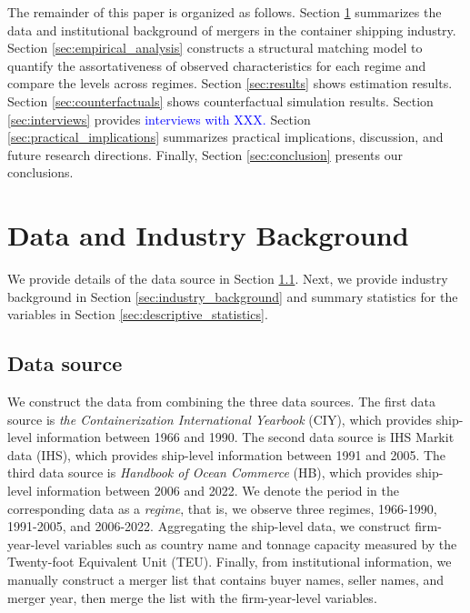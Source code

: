 \documentclass[10pt]{article}
\begin{document}
The remainder of this paper is organized as follows. 
Section \ref{sec:data_and_institutional_background} summarizes the data and institutional background of mergers in the container shipping industry.
Section \ref{sec:empirical_analysis} constructs a structural matching model to quantify the assortativeness of observed characteristics for each regime and compare the levels across regimes.
Section \ref{sec:results} shows estimation results.
Section \ref{sec:counterfactuals} shows counterfactual simulation results.
Section \ref{sec:interviews} provides \textcolor{blue}{interviews with XXX.}
Section \ref{sec:practical_implications} summarizes practical implications, discussion, and future research directions.
Finally, Section \ref{sec:conclusion} presents our conclusions.


\section{Data and Industry Background}\label{sec:data_and_institutional_background}
We provide details of the data source in Section \ref{sec:data_source}. Next, we provide industry background in
Section \ref{sec:industry_background} and summary statistics for the variables in Section \ref{sec:descriptive_statistics}.




\subsection{Data source}\label{sec:data_source}
We construct the data from combining the three data sources. 
The first data source is \textit{the Containerization International Yearbook} (CIY), which provides ship-level information between 1966 and 1990.
The second data source is IHS Markit data (IHS), which provides ship-level information between 1991 and 2005.
The third data source is \textit{Handbook of Ocean Commerce} (HB), which provides ship-level information between 2006 and 2022. 
We denote the period in the corresponding data as a \textit{regime}, that is, we observe three regimes, 1966-1990, 1991-2005, and 2006-2022.
Aggregating the ship-level data, we construct firm-year-level variables such as country name and tonnage capacity measured by the Twenty-foot Equivalent Unit (TEU). 
Finally, from institutional information, we manually construct a merger list that contains buyer names, seller names, and merger year, then merge the list with the firm-year-level variables. 
\end{document}
